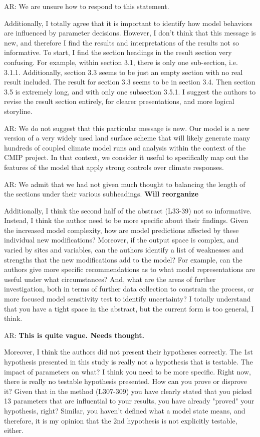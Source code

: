 \documentclass{article}
\begin{document}
\textsf{AR: We are unsure how to respond to this statement. }

Additionally, I totally agree that it is important to identify how model behaviors are influenced by parameter decisions. However, I don't think that this message is new, and therefore I find the results and interpretations of the results not so informative. To start, I find the section headings in the result section very confusing. For example, within section 3.1, there is only one sub-section, i.e. 3.1.1. Additionally, section 3.3 seems to be just an empty section with no real result included. The result for section 3.3 seems to be in section 3.4. Then section 3.5 is extremely long, and with only one subsection 3.5.1. I suggest the authors to revise the result section entirely, for clearer presentations, and more logical storyline. 

\textsf{AR: We do not suggest that this particular message is new. Our model is a new version of a very widely used land surface scheme that will likely generate many hundreds of coupled climate model runs and analysis within the context of the CMIP project. In that context, we consider it useful to specifically map out the features of the model that apply strong controls over climate responses.} 

\textsf{AR: We admit that we had not given much thought to balancing the length of the sections under their various subheadings. \textbf{Will reorganize}}

Additionally, I think the second half of the abstract (L33-39) not so informative. Instead, I think the author need to be more specific about their findings. Given the increased model complexity, how are model predictions affected by these individual new modifications? Moreover, if the output space is complex, and varied by sites and variables, can the authors identify a list of weaknesses and strengths that the new modifications add to the model? For example, can the authors give more specific recommendations as to what model representations are useful under what circumstances? And, what are the areas of further investigation, both in terms of further data collection to constrain the process, or more focused model sensitivity test to identify uncertainty? I totally understand that you have a tight space in the abstract, but the current form is too general, I think. 

\textsf{AR: \textbf{This is quite vague. Needs thought. }}

Moreover, I think the authors did not present their hypotheses correctly. The 1st hypothesis presented in this study is really not a hypothesis that is testable. The impact of parameters on what? I think you need to be more specific. Right now, there is really no testable hypothesis presented. How can you prove or disprove it? Given that in the method (L307-309) you have clearly stated that you picked 13 parameters that are influential to your results, you have already "proved" your hypothesis, right? Similar, you haven't defined what a model state means, and therefore, it is my opinion that the 2nd hypothesis is not explicitly testable, either. 
\end{document}

